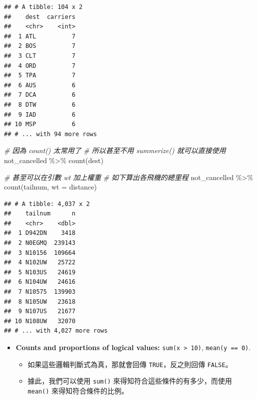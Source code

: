 \documentclass[
]{book}
\newenvironment{Shaded}{\begin{snugshade}}{\end{snugshade}}
\newcommand{\AttributeTok}[1]{\textcolor[rgb]{0.77,0.63,0.00}{#1}}
\newcommand{\CommentTok}[1]{\textcolor[rgb]{0.56,0.35,0.01}{\textit{#1}}}
\newcommand{\FunctionTok}[1]{\textcolor[rgb]{0.00,0.00,0.00}{#1}}
\newcommand{\NormalTok}[1]{#1}
\newcommand{\SpecialCharTok}[1]{\textcolor[rgb]{0.00,0.00,0.00}{#1}}
\providecommand{\tightlist}{%
  \setlength{\itemsep}{0pt}\setlength{\parskip}{0pt}}
\theoremstyle{definition}
\theoremstyle{remark}
\begin{document}
\begin{verbatim}
## # A tibble: 104 x 2
##    dest  carriers
##    <chr>    <int>
##  1 ATL          7
##  2 BOS          7
##  3 CLT          7
##  4 ORD          7
##  5 TPA          7
##  6 AUS          6
##  7 DCA          6
##  8 DTW          6
##  9 IAD          6
## 10 MSP          6
## # ... with 94 more rows
\end{verbatim}

\begin{Shaded}
\begin{Highlighting}[]
\CommentTok{\# 因為 count() 太常用了}
\CommentTok{\# 所以甚至不用 summerize() 就可以直接使用}
\NormalTok{not\_cancelled }\SpecialCharTok{\%\textgreater{}\%}
  \FunctionTok{count}\NormalTok{(dest)}
\end{Highlighting}
\end{Shaded}

\begin{Shaded}
\begin{Highlighting}[]
\CommentTok{\# 甚至可以在引數 wt 加上權重}
\CommentTok{\# 如下算出各飛機的總里程}
\NormalTok{not\_cancelled }\SpecialCharTok{\%\textgreater{}\%}
  \FunctionTok{count}\NormalTok{(tailnum, }\AttributeTok{wt =}\NormalTok{ distance)}
\end{Highlighting}
\end{Shaded}

\begin{verbatim}
## # A tibble: 4,037 x 2
##    tailnum      n
##    <chr>    <dbl>
##  1 D942DN    3418
##  2 N0EGMQ  239143
##  3 N10156  109664
##  4 N102UW   25722
##  5 N103US   24619
##  6 N104UW   24616
##  7 N10575  139903
##  8 N105UW   23618
##  9 N107US   21677
## 10 N108UW   32070
## # ... with 4,027 more rows
\end{verbatim}

\begin{itemize}
\item
  \textbf{Counts and proportions of logical values:} \texttt{sum(x\ \textgreater{}\ 10)}, \texttt{mean(y\ ==\ 0)}.

  \begin{itemize}
  \tightlist
  \item
    如果這些邏輯判斷式為真，那就會回傳 \texttt{TRUE}，反之則回傳 \texttt{FALSE}。
  \item
    據此，我們可以使用 \texttt{sum()} 來得知符合這些條件的有多少，而使用 \texttt{mean()} 來得知符合條件的比例。
  \end{itemize}
\end{itemize}
\end{document}
